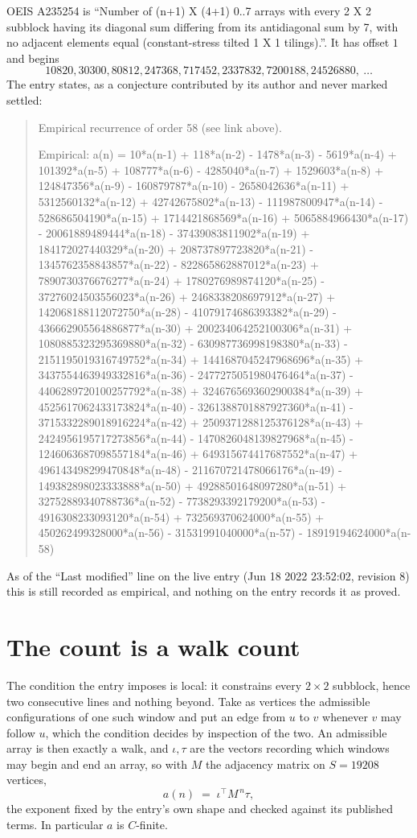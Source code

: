 \documentclass[11pt,a4paper]{article}
\theoremstyle{plain}
\theoremstyle{definition}
\begin{document}
OEIS A235254 is ``Number of (n+1) X (4+1) 0..7 arrays with every 2 X 2 subblock having its diagonal sum differing from its antidiagonal sum by 7, with no adjacent elements equal (constant-stress tilted 1 X 1 tilings).''. It has offset $1$ and begins
\[
10820, 30300, 80812, 247368, 717452, 2337832, 7200188, 24526880,\ \dots
\]
The entry states, as a conjecture contributed by its author and never marked settled:
\begin{quote}\raggedright\small
Empirical recurrence of order 58 (see link above).

Empirical: a(n) = 10*a(n-1) + 118*a(n-2) - 1478*a(n-3) - 5619*a(n-4) + 101392*a(n-5) + 108777*a(n-6) - 4285040*a(n-7) + 1529603*a(n-8) + 124847356*a(n-9) - 160879787*a(n-10) - 2658042636*a(n-11) + 5312560132*a(n-12) + 42742675802*a(n-13) - 111987800947*a(n-14) - 528686504190*a(n-15) + 1714421868569*a(n-16) + 5065884966430*a(n-17) - 20061889489444*a(n-18) - 37439083811902*a(n-19) + 184172027440329*a(n-20) + 208737897723820*a(n-21) - 1345762358843857*a(n-22) - 822865862887012*a(n-23) + 7890730376676277*a(n-24) + 1780276989874120*a(n-25) - 37276024503556023*a(n-26) + 2468338208697912*a(n-27) + 142068188112072750*a(n-28) - 41079174686393382*a(n-29) - 436662905564886877*a(n-30) + 200234064252100306*a(n-31) + 1080885323295369880*a(n-32) - 630987736998198380*a(n-33) - 2151195019316749752*a(n-34) + 1441687045247968696*a(n-35) + 3437554463949332816*a(n-36) - 2477275051980476464*a(n-37) - 4406289720100257792*a(n-38) + 3246765693602900384*a(n-39) + 4525617062433173824*a(n-40) - 3261388701887927360*a(n-41) - 3715332289018916224*a(n-42) + 2509371288125376128*a(n-43) + 2424956195717273856*a(n-44) - 1470826048139827968*a(n-45) - 1246063687098557184*a(n-46) + 649315674417687552*a(n-47) + 496143498299470848*a(n-48) - 211670721478066176*a(n-49) - 149382898023333888*a(n-50) + 49288501648097280*a(n-51) + 32752889340788736*a(n-52) - 7738293392179200*a(n-53) - 4916308233093120*a(n-54) + 732569370624000*a(n-55) + 450262499328000*a(n-56) - 31531991040000*a(n-57) - 18919194624000*a(n-58)
\end{quote}
As of the ``Last modified'' line on the live entry (Jun 18 2022 23:52:02, revision 8) this is still
recorded as empirical, and nothing on the entry records it as proved.

\section{The count is a walk count}

The condition the entry imposes is local: it constrains every $2\times2$ subblock, hence two consecutive lines and nothing beyond. Take as vertices the admissible configurations of one such window and put an edge from $u$ to $v$ whenever $v$ may follow $u$, which the condition decides by inspection of the two.
An admissible array is then exactly a walk, and $\iota,\tau$ are the vectors recording which windows may begin and end an array, so with $M$ the adjacency matrix on $S=19208$ vertices,
\[
a(n)\;=\;\iota^{\!\top}M^{\,n}\tau ,
\]
the exponent fixed by the entry's own shape and checked against its published terms. In
particular $a$ is $C$-finite.
\end{document}

